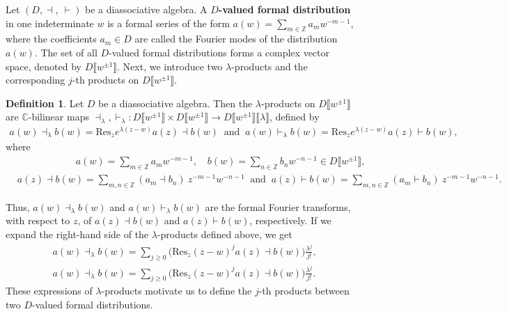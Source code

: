 \documentclass[a4paper,reqno,10pt]{amsart}
\theoremstyle{plain}
\theoremstyle{definition}
\newtheorem{definition}[thm]{Definition}
\theoremstyle{remark}
\newcommand{\C}{\mathbb{C}}
\newcommand{\la}{\lambda}
\begin{document}
 Let $( D,\dashv, ~\!\vdash)$ be a diassociative algebra. A $D${\bf -valued formal distribution} in one indeterminate $w$ is a formal series of the form $a(w)=\sum \limits_{m \in \mathbb{Z}} a_{m} w^{-m-1}$, where the coefficients $a_{m} \in D$ are called the Fourier modes of the distribution $a(w)$. The set of all $D$-valued formal distributions forms a complex vector space, denoted by $D\llbracket w^{\pm1}\rrbracket$.
 Next, we introduce two $\la$-products and the corresponding $j$-th products on $D\llbracket w^{\pm1}\rrbracket$.
 \begin{definition}
    Let $D$ be a diassociative algebra. Then the $\la$-products on $D \llbracket w^{\pm 1 }\rrbracket$ are $\C$-bilinear maps $ \dashv_{\la}, \vdash_{\la}: D \llbracket w^{\pm 1 }\rrbracket \times D \llbracket w^{\pm 1 }\rrbracket \rightarrow D \llbracket w^{\pm 1 }\rrbracket  \llbracket  \la  \rrbracket$, defined by 
    \begin{align}\label{la-bra}
    a(w) \dashv_{\la} b(w)  = \text{Res}_{z} e^{\la(z-w)} a(z) \dashv b(w)~ \text{ and } ~a(w) \vdash_{\la} b(w) = \text{Res}_{z}e^{\la(z-w)}a(z) \vdash b(w),
\end{align}
  where
    \begin{align*}
& \qquad \qquad \qquad a(w)=\sum \limits_{m \in \mathbb{Z}} a_{m} w^{-m-1}, \quad b(w)=\sum \limits_{n \in \mathbb{Z}} b_{n} w^{-n-1} \in D\llbracket w^{\pm1}\rrbracket, \\
&a(z) \dashv b(w)= \sum_{m,n \in \mathbb{Z} }(a_m \dashv b_n) ~ \! z^{-m-1}w^{-n-1} ~  \text{ and } ~   a(z) \vdash b(w)= \sum_{m,n \in \mathbb{Z} }(a_m \vdash b_n) ~ \! z^{-m-1}w^{-n-1}.
\end{align*}
\end{definition}
\noindent Thus, $a(w)\dashv_{\la}b(w)$ and $a(w)\vdash_{\la}b(w)$ are the formal Fourier transforms, with respect to $z$, of $a(z)\dashv b(w)$ and $a(z)\vdash b(w)$, respectively. If we expand the right-hand side of the $\la$-products defined above, we get
\begin{align*}
    &a(w) \dashv_{\la} b(w)  = \sum_{j \geq 0} \big( \text{Res}_{z} (z-w)^{j} a(z) \dashv b(w) \big) \frac{\la^j}{j!},\\
    &a(w) \dashv_{\la} b(w)  = \sum_{j \geq 0} \big( \text{Res}_{z} (z-w)^{j} a(z) \dashv b(w) \big) \frac{\la^j}{j!}.
\end{align*}
These expressions of $\la$-products motivate us to define the $j$-th products between two $D$-valued formal distributions.
\end{document}
